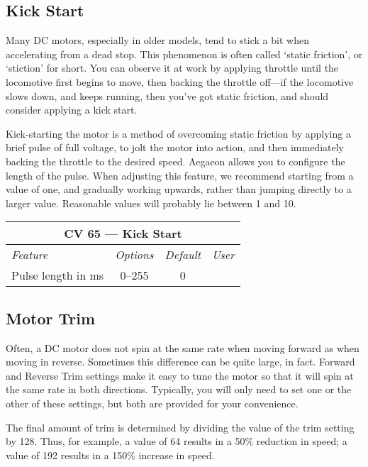 \documentclass[12pt,letterpaper,draft]{memoir} %
\begin{document}
\subsection{Kick Start}
\label{KickStart}
Many DC motors, especially in older models, tend to stick a bit when accelerating from a dead stop. This phenomenon is often called `static friction', or `stiction' for short. You can observe it at work by applying throttle until the locomotive first begins to move, then backing the throttle off---if the locomotive slows down, and keeps running, then you've got static friction, and should consider applying a kick start.

Kick-starting the motor is a method of overcoming static friction by applying a brief pulse of full voltage, to jolt the motor into action, and then immediately backing the throttle to the desired speed. Aegaeon allows you to configure the length of the pulse. When adjusting this feature, we recommend starting from a value of one, and gradually working upwards, rather than jumping directly to a larger value. Reasonable values will probably lie between 1 and 10.

\label{CV65}
\begin{center}
\begin{tabular}{|l|c|c|c|}
\hline
\multicolumn{4}{|c|}{\textbf{CV 65 --- Kick Start}} \\ \hline \hline
\textit{Feature} & \textit{Options} & \textit{Default} & \textit{User} \\ \hline
Pulse length in ms & 0--255 & 0 &\\ \hline
\end{tabular}
\end{center}


\subsection{Motor Trim}
\label{MotorTrim}
Often, a DC motor does not spin at the same rate when moving forward as when moving in reverse. Sometimes this difference can be quite large, in fact. Forward and Reverse Trim settings make it easy to tune the motor so that it will spin at the same rate in both directions. Typically, you will only need to set one or the other of these settings, but both are provided for your convenience.

The final amount of trim is determined by dividing the value of the trim setting by 128. Thus, for example, a value of 64 results in a 50\% reduction in speed; a value of 192 results in a 150\% increase in speed.
\end{document}
